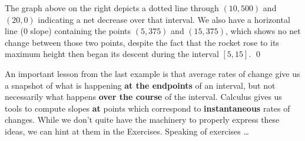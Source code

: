 \documentclass{ximera}
\begin{document}
\begin{example}
\begin{enumerate}
\begin{multicols}{2}
\end{multicols}


The graph above on the right depicts a dotted line through $(10, 500)$ and $(20,0)$ indicating a net decrease over that interval.  We also have a horizontal line ($0$ slope) containing the points $(5, 375)$ and $(15, 375)$, which shows no net change between those two points, despite the fact that the rocket rose to its maximum height then began its descent during the interval $[5, 15]$.   \qed




\end{enumerate}



\end{example}

An important lesson from the last example is that average rates of change give us a snapshot of what is happening \textbf{at the endpoints} of an interval, but not necessarily what happens \textbf{over the course} of the interval.  Calculus gives us tools to compute slopes \textbf{at} points which correspond to  \textbf{instantaneous} rates of changes.  While we don't quite have the machinery to properly express these ideas, we can hint at them in the Exercises. Speaking of exercises \ldots 
\end{document}
